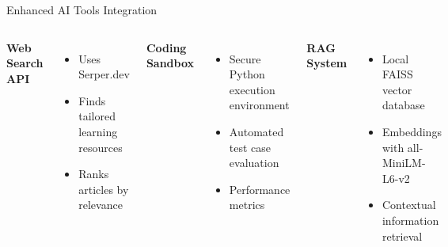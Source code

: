 \documentclass{beamer}
\begin{document}
\begin{frame}{Enhanced AI Tools Integration}
    \begin{columns}[T,onlytextwidth]
        \textbf{Web Search API}
        \begin{itemize}
            \item Uses Serper.dev
            \item Finds tailored learning resources
            \item Ranks articles by relevance
        \end{itemize}
        
        \textbf{Coding Sandbox}
        \begin{itemize}
            \item Secure Python execution environment
            \item Automated test case evaluation
            \item Performance metrics
        \end{itemize}
        
        \textbf{RAG System}
        \begin{itemize}
            \item Local FAISS vector database
            \item Embeddings with all-MiniLM-L6-v2
            \item Contextual information retrieval
        \end{itemize}
    \end{columns}
\end{frame}
\end{document}
